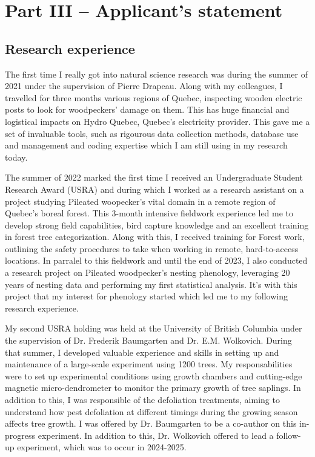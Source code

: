 \documentclass{article}
\begin{document}
\section*{Part III – Applicant’s statement}

\subsection*{Research experience}
The first time I really got into natural science research was during the summer of 2021 under the supervision of Pierre Drapeau. Along with my colleagues, I travelled for three months various regions of Quebec, inspecting wooden electric posts to look for woodpeckers' damage on them. This has huge financial and logistical impacts on Hydro Quebec, Quebec's electricity provider. This gave me a set of invaluable tools, such as rigourous data collection methods, database use and management and coding expertise which I am still using in my research today.

The summer of 2022 marked the first time I received an Undergraduate Student Research Award (USRA) and during which I worked as a research assistant on a project studying Pileated woopecker's vital domain in a remote region of Quebec's boreal forest. This 3-month intensive fieldwork experience led me to develop strong field capabilities, bird capture knowledge and an excellent training in forest tree categorization. Along with this, I received training for Forest work, outlining the safety procedures to take when working in remote, hard-to-access locations. In parralel to this fieldwork and until the end of 2023, I also conducted a research project on Pileated woodpecker's nesting phenology, leveraging 20 years of nesting data and performing my first statistical analysis. It's with this project that my interest for phenology started which led me to my following research experience.

My second USRA holding was held at the University of British Columbia under the supervision of Dr. Frederik Baumgarten and Dr. E.M. Wolkovich. During that summer, I developed valuable experience and skills in setting up and maintenance of a large-scale experiment using 1200 trees. My responsabilities were to set up experimental conditions using growth chambers and cutting-edge magnetic micro-dendrometer to monitor the primary growth of tree saplings. In addition to this, I was responsible of the defoliation treatments, aiming to understand how pest defoliation at different timings during the growing season affects tree growth. I was offered by Dr. Baumgarten to be a co-author on this in-progress experiment. In addition to this, Dr. Wolkovich offered to lead a follow-up experiment, which was to occur in 2024-2025.
\end{document}

